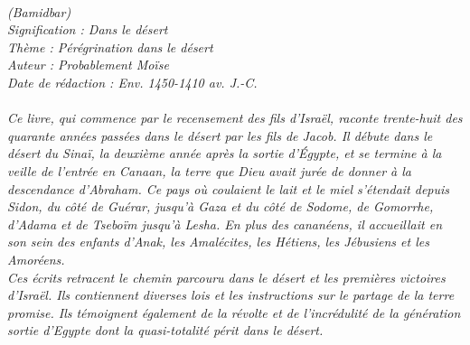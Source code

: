 \BFont
\noindent\hrulefill
{\footnotesize
\textit{
\bigskip
{\centering{}
\\(Bamidbar)
\\Signification : Dans le désert
\\Thème : Pérégrination dans le désert
\\Auteur : Probablement Moïse
\\Date de rédaction : Env. 1450-1410 av. J.-C.\\}
}
\textit{
\\Ce livre, qui commence par le recensement des fils d’Israël, raconte trente-huit des quarante années passées dans le désert par les fils de Jacob. Il débute dans le désert du Sinaï, la deuxième année après la sortie d’Égypte, et se termine à la veille de l’entrée en Canaan, la terre que Dieu avait jurée de donner à la descendance d’Abraham. Ce pays où coulaient le lait et le miel s’étendait depuis Sidon, du côté de Guérar, jusqu’à Gaza et du côté de Sodome, de Gomorrhe, d’Adama et de Tseboïm jusqu’à Lesha. En plus des cananéens, il accueillait en son sein des enfants d’Anak, les Amalécites, les Hétiens, les Jébusiens et les Amoréens.
\\Ces écrits retracent le chemin parcouru dans le désert et les premières victoires d’Israël. Ils contiennent diverses lois et les instructions sur le partage de la terre promise. Ils témoignent également de la révolte et de l’incrédulité de la génération sortie d’Egypte dont la quasi-totalité périt dans le désert.\bigskip
}
}
\par\nobreak\noindent\hrulefill
